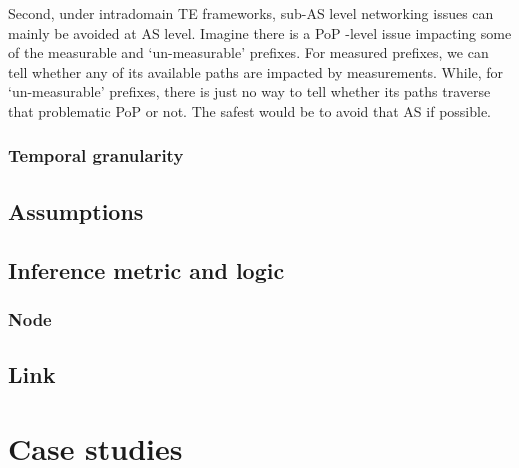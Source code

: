 Second, under intradomain TE frameworks, sub-AS level networking issues can mainly be avoided at AS level. Imagine there is a \acf{PoP} -level issue impacting some of the measurable and `un-measurable' prefixes. For measured prefixes, we can tell whether any of its available paths are impacted by measurements. While, for `un-measurable' prefixes, there is just no way to tell whether its paths traverse that problematic PoP or not. The safest would be to avoid that AS if possible.


\subsubsection{Temporal granularity}


\subsection{Assumptions}

\subsection{Inference metric and logic}
\subsubsection{Node}
\subsection{Link}

\section{Case studies}
